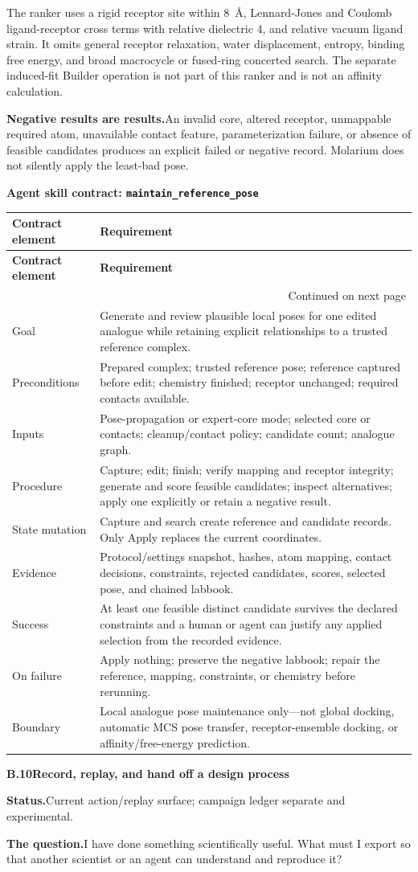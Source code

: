 \documentclass[10pt,letterpaper]{article}
\makeatletter
\newcommand{\code}[1]{\texttt{#1}}
\newcommand{\lead}[1]{\textbf{#1}\hspace{0.35em}}
\newcommand{\workflowsection}[4]{%
  \par\needspace{5\baselineskip}\vspace{7.5pt}%
  {\fontsize{10.91}{13.1}\selectfont\bfseries #1\hspace{1.1em}#2}\par\vspace{2pt}%
  \lead{Status.}#3.\par\vspace{-3.5pt}%
  \lead{The question.}#4\par}
\newenvironment{skillcontract}[1]{%
  \par\needspace{5\baselineskip}\vspace{2pt}%
  {\fontsize{10.91}{13.1}\selectfont\bfseries Agent skill contract: \code{#1}}\par\vspace{1pt}%
  \fontsize{8.4}{10}\selectfont
  \begin{longtable}{@{}K V@{}}
  \toprule
  \textbf{Contract element} & \textbf{Requirement}\\
  \midrule
  \endfirsthead
  \toprule
  \textbf{Contract element} & \textbf{Requirement}\\
  \midrule
  \endhead
  \midrule
  \multicolumn{2}{r}{\footnotesize Continued on next page}\\
  \endfoot
  \bottomrule
  \endlastfoot
}{%
  \end{longtable}
  \normalsize\fontsize{9.96}{11.95}\selectfont}
\newcommand{\contractrow}[2]{#1 & #2\\}
\makeatother
\begin{document}
The ranker uses a rigid receptor site within 8~\AA, Lennard-Jones and Coulomb ligand-receptor cross terms with relative dielectric 4, and relative vacuum ligand strain. It omits general receptor relaxation, water displacement, entropy, binding free energy, and broad macrocycle or fused-ring concerted search. The separate induced-fit Builder operation is not part of this ranker and is not an affinity calculation.

\lead{Negative results are results.}An invalid core, altered receptor, unmappable required atom, unavailable contact feature, parameterization failure, or absence of feasible candidates produces an explicit failed or negative record. Molarium does not silently apply the least-bad pose.

\begin{skillcontract}{maintain\_reference\_pose}
\contractrow{Goal}{Generate and review plausible local poses for one edited analogue while retaining explicit relationships to a trusted reference complex.}
\contractrow{Preconditions}{Prepared complex; trusted reference pose; reference captured before edit; chemistry finished; receptor unchanged; required contacts available.}
\contractrow{Inputs}{Pose-propagation or expert-core mode; selected core or contacts; cleanup/contact policy; candidate count; analogue graph.}
\contractrow{Procedure}{Capture; edit; finish; verify mapping and receptor integrity; generate and score feasible candidates; inspect alternatives; apply one explicitly or retain a negative result.}
\contractrow{State mutation}{Capture and search create reference and candidate records. Only Apply replaces the current coordinates.}
\contractrow{Evidence}{Protocol/settings snapshot, hashes, atom mapping, contact decisions, constraints, rejected candidates, scores, selected pose, and chained labbook.}
\contractrow{Success}{At least one feasible distinct candidate survives the declared constraints and a human or agent can justify any applied selection from the recorded evidence.}
\contractrow{On failure}{Apply nothing; preserve the negative labbook; repair the reference, mapping, constraints, or chemistry before rerunning.}
\contractrow{Boundary}{Local analogue pose maintenance only---not global docking, automatic MCS pose transfer, receptor-ensemble docking, or affinity/free-energy prediction.}
\end{skillcontract}

\workflowsection{B.10}{Record, replay, and hand off a design process}{Current action/replay surface; campaign ledger separate and experimental}{I have done something scientifically useful. What must I export so that another scientist or an agent can understand and reproduce it?}
\end{document}
